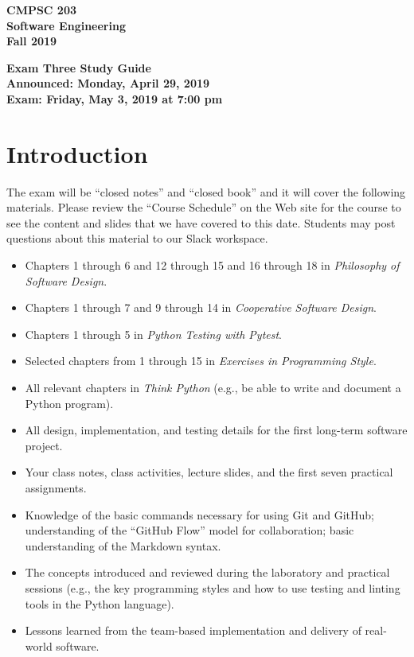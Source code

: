 \documentclass[11pt]{article}
\newcommand{\assignmentduedate}{May 3}
\newcommand{\assignmentassignedate}{April 29}
\newcommand{\assignmentnumber}{Three}
\newcommand{\labyear}{2019}
\newcommand{\assignedday}{Monday}
\newcommand{\dueday}{Friday}
\newcommand{\labtime}{7:00 pm}
\newcommand{\assigneddate}{Announced: \assignedday, \assignmentassignedate, \labyear{}}
\newcommand{\duedate}{Exam: \dueday, \assignmentduedate, \labyear{} at \labtime{}}
\newcommand{\cooperative}{{\em Cooperative Software Design\/}}
\newcommand{\philosophy}{{\em Philosophy of Software Design\/}}
\newcommand{\thinkpython}{{\em Think Python\/}}
\newcommand{\programmingstyle}{{\em Exercises in Programming Style\/}}
\newcommand{\pytest}{{\em Python Testing with Pytest\/}}
\newcommand{\guidetitle}[1]
{
  \begin{center}
    \begin{center}
      \bf
      CMPSC 203\\Software Engineering\\
      Fall 2019\\
      \medskip
    \end{center}
    \bf
    #1
  \end{center}
}
\begin{document}
\thispagestyle{empty}

\guidetitle{Exam \assignmentnumber{} Study Guide \\ \assigneddate{} \\ \duedate{}}

\section*{Introduction}

\noindent The exam will be ``closed notes'' and ``closed book'' and it will
cover the following materials. Please review the ``Course Schedule'' on the Web
site for the course to see the content and slides that we have covered to this
date. Students may post questions about this material to our Slack workspace.

\vspace*{-.5em}
\begin{itemize}

  \itemsep 0in

  \item Chapters 1 through 6 and 12 through 15 and 16 through 18 in \philosophy{}.

  \item Chapters 1 through 7 and 9 through 14 in \cooperative{}.

  \item Chapters 1 through 5 in \pytest{}.

  \item Selected chapters from 1 through 15 in \programmingstyle{}.

  \item All relevant chapters in \thinkpython{} (e.g., be able to write and
    document a Python program).

  \item All design, implementation, and testing details for the first long-term
    software project.

  \item Your class notes, class activities, lecture slides, and the first seven
    practical assignments.

  \item Knowledge of the basic commands necessary for using Git and GitHub;
    understanding of the ``GitHub Flow'' model for collaboration; basic
    understanding of the Markdown syntax.

  \item The concepts introduced and reviewed during the laboratory and practical
    sessions (e.g., the key programming styles and how to use testing and
    linting tools in the Python language).

  \item Lessons learned from the team-based implementation and delivery of
    real-world software.

\end{itemize}
\vspace*{-.5em}
\end{document}
